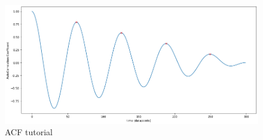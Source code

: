 \begin{figure}[ht]
\centering
\includegraphics[scale=0.45]{images/ACF u DIAGRAM.png}
\caption{ACF tutorial}
\label{ACF coefficient}
\end{figure}

